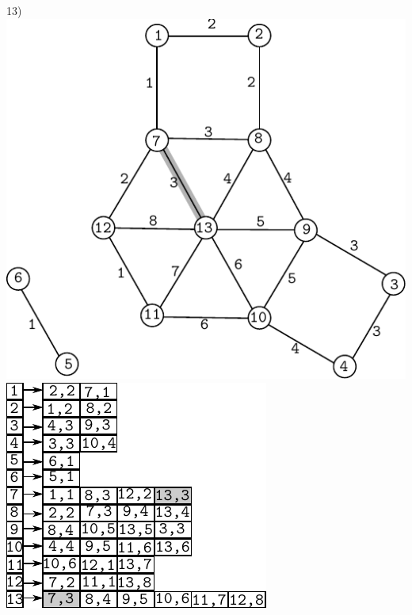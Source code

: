\documentclass{article}
\begin{document}
\begin{center}
13)\includegraphics[scale=0.6]{bottleneck/g13}
\hspace{5mm}
\includegraphics[scale=0.9]{bottleneck/l13}
\end{center}
\end{document}
